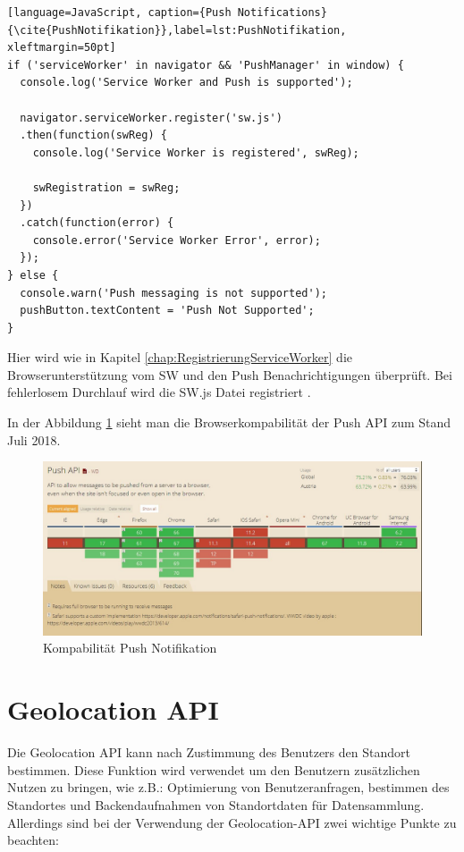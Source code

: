 \begin{lstlisting}[language=JavaScript, caption={Push Notifications} {\cite{PushNotifikation}},label=lst:PushNotifikation, xleftmargin=50pt]
if ('serviceWorker' in navigator && 'PushManager' in window) {
  console.log('Service Worker and Push is supported');

  navigator.serviceWorker.register('sw.js')
  .then(function(swReg) {
    console.log('Service Worker is registered', swReg);

    swRegistration = swReg;
  })
  .catch(function(error) {
    console.error('Service Worker Error', error);
  });
} else {
  console.warn('Push messaging is not supported');
  pushButton.textContent = 'Push Not Supported';
}
\end{lstlisting}

Hier wird wie in Kapitel \ref{chap:RegistrierungServiceWorker} die Browserunterstützung vom \acs{SW} und den Push Benachrichtigungen überprüft. Bei fehlerlosem Durchlauf wird die \acs{SW}.js Datei registriert \cite{PushNotifikation}.
\newpage

In der Abbildung \ref{fig:BrowserPushAPI} sieht man die Browserkompabilität der Push API zum Stand Juli 2018.
\begin{figure}[h]
	\centering
	\includegraphics[width=14cm]{BilderAllgemein/BrowserPushAPI}\medskip
	\caption{Kompabilität Push Notifikation \cite{BrowserSupport}}
	\label{fig:BrowserPushAPI}
\end{figure}




\newpage
\section{Geolocation API}
Die Geolocation API kann nach Zustimmung des Benutzers den Standort bestimmen. Diese Funktion wird verwendet  um den Benutzern zusätzlichen Nutzen zu bringen, wie z.B.: Optimierung von Benutzeranfragen, bestimmen des Standortes und Backendaufnahmen von Standortdaten für Datensammlung. 
Allerdings sind bei der Verwendung der Geolocation-API zwei wichtige Punkte zu beachten:

